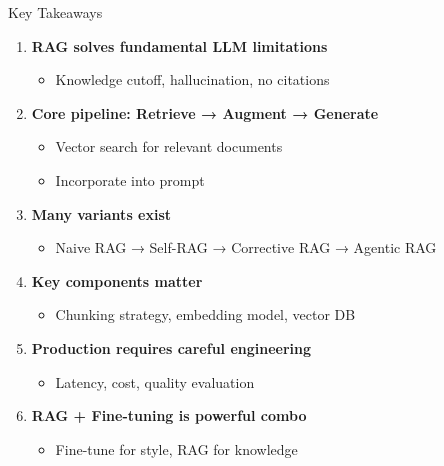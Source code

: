 \documentclass[aspectratio=169]{beamer}
\begin{document}
\begin{frame}[shrink=10]{Key Takeaways 🔑}
\begin{enumerate}\setlength{\itemsep}{0pt}
    \item \textbf{RAG solves fundamental LLM limitations}
    \begin{itemize}\setlength{\itemsep}{0pt}
        \item Knowledge cutoff, hallucination, no citations
    \end{itemize}

    \item \textbf{Core pipeline: Retrieve → Augment → Generate}
    \begin{itemize}\setlength{\itemsep}{0pt}
        \item Vector search for relevant documents
        \item Incorporate into prompt
    \end{itemize}

    \item \textbf{Many variants exist}
    \begin{itemize}\setlength{\itemsep}{0pt}
        \item Naive RAG → Self-RAG → Corrective RAG → Agentic RAG
    \end{itemize}

    \item \textbf{Key components matter}
    \begin{itemize}\setlength{\itemsep}{0pt}
        \item Chunking strategy, embedding model, vector DB
    \end{itemize}

    \item \textbf{Production requires careful engineering}
    \begin{itemize}\setlength{\itemsep}{0pt}
        \item Latency, cost, quality evaluation
    \end{itemize}

    \item \textbf{RAG + Fine-tuning is powerful combo}
    \begin{itemize}\setlength{\itemsep}{0pt}
        \item Fine-tune for style, RAG for knowledge
    \end{itemize}
\end{enumerate}
\end{frame}
\end{document}
